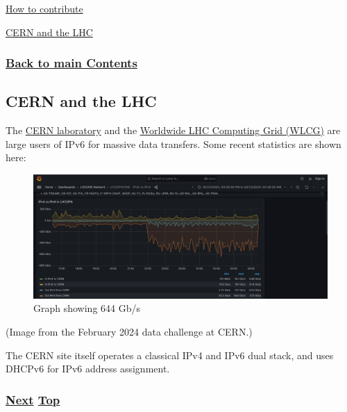 \documentclass[
]{article}
\begin{document}
\href{https://github.com/becarpenter/book6/blob/main/1.\%20Introduction\%20and\%20Foreword/How\%20to\%20contribute.md\#how-to-contribute}{How
to contribute}

\hyperref[cern-and-the-lhc]{CERN and the LHC}

\subsubsection{\texorpdfstring{\hyperref[list-of-contents]{Back to main
Contents}}{Back to main Contents}}\label{back-to-main-contents-6}

\pagebreak

\subsection{CERN and the LHC}\label{cern-and-the-lhc}

The \href{https://www.cern.ch}{CERN laboratory} and the
\href{https://home.cern/science/computing/grid}{Worldwide LHC Computing
Grid (WLCG)} are large users of IPv6 for massive data transfers. Some
recent statistics are shown here:

\begin{figure}
\centering
\includegraphics{CERN-IPv6-Feb24.png}
\caption{Graph showing 644 Gb/s}
\end{figure}

(Image from the February 2024 data challenge at CERN.)

The CERN site itself operates a classical IPv4 and IPv6 dual stack, and
uses DHCPv6 for IPv6 address assignment.

\subsubsection{\texorpdfstring{\hyperref[deployment-status]{Next}
\hyperref[case-studies]{Top}}{Next Top}}\label{next-top-6}

\pagebreak
\end{document}
